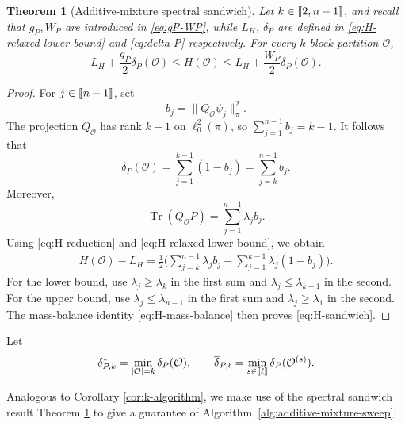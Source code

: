 \documentclass[11pt]{article}
\newtheorem{theorem}{Theorem}[section]
\newcommand{\1}{\mathbf{1}}
\providecommand{\llbracket}{\mathopen{[\mkern-2.7mu[}}
\providecommand{\rrbracket}{\mathclose{]\mkern-2.7mu]}}
\begin{document}
\begin{theorem}[Additive-mixture spectral sandwich]
\label{thm:H-sandwich}
Let $k\in\llbracket 2,n-1\rrbracket$, and recall that $g_P, W_P$ are introduced in \eqref{eq:gP-WP}, while $L_H$, $\delta_P$ are defined in \eqref{eq:H-relaxed-lower-bound} and \eqref{eq:delta-P} respectively. For every $k$-block partition $\mathcal O$,
\begin{equation}
    L_H+\frac{g_P}{2}\delta_P(\mathcal O)
    \leq H(\mathcal O)
    \leq
    L_H+\frac{W_P}{2}\delta_P(\mathcal O).
    \label{eq:H-sandwich}
\end{equation}
\end{theorem}

\begin{proof}
For $j\in\llbracket n-1\rrbracket$, set
\[
    b_j=\|Q_{\mathcal O}\psi_j\|_\pi^2.
\]
The projection $Q_{\mathcal O}$ has rank $k-1$ on $\ell^2_0(\pi)$, so
$\sum_{j=1}^{n-1}b_j=k-1$.  It follows that
\begin{equation}
    \delta_P(\mathcal O)
    =\sum_{j=1}^{k-1}(1-b_j)
    =\sum_{j=k}^{n-1}b_j.
    \label{eq:H-mass-balance}
\end{equation}
Moreover,
\[
    \operatorname{Tr}(Q_{\mathcal O}P)
    =\sum_{j=1}^{n-1}\lambda_jb_j.
\]
Using \eqref{eq:H-reduction} and
\eqref{eq:H-relaxed-lower-bound}, we obtain
\[
\begin{split}
    H(\mathcal O)-L_H
    =\frac12\biggl(
       \sum_{j=k}^{n-1}\lambda_jb_j
       -\sum_{j=1}^{k-1}\lambda_j(1-b_j)
      \biggr).
\end{split}
\]
For the lower bound, use
$\lambda_j\geq\lambda_{k}$ in the first sum and
$\lambda_j\leq\lambda_{k-1}$ in the second.  For the upper bound, use
$\lambda_j\leq\lambda_{n-1}$ in the first sum and
$\lambda_j\geq\lambda_1$ in the second.  The mass-balance identity
\eqref{eq:H-mass-balance} then proves \eqref{eq:H-sandwich}.
\end{proof}

Let
\[
    \delta_{P,k}^*
    =\min_{|\mathcal O|=k}\delta_P(\mathcal O),
    \qquad
    \overline\delta_{P,\ell}
    =\min_{s\in\llbracket\ell\rrbracket}
      \delta_P(\mathcal O^{(s)}).
\]

Analogous to Corollary \ref{cor:k-algorithm}, we make use of the spectral sandwich result Theorem \ref{thm:H-sandwich} to give a guarantee of Algorithm~\ref{alg:additive-mixture-sweep}:
\end{document}
